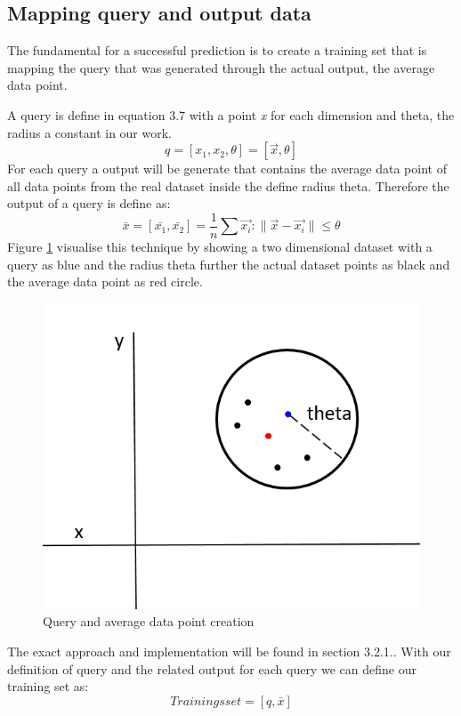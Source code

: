 \documentclass{lmproj}
\begin{document}
\subsection{Mapping query and output data}

The fundamental for a successful prediction is to create a training set that is mapping the query that was generated through the actual output, the average data point.

A query is define in equation 3.7 with a point \textit{x} for each dimension and theta, the radius a constant in our work.  
\begin{equation}
q=[x_1,x_2,\theta] =[\vec{x},\theta]
\end{equation}
For each query a output will be generate that contains the average data point of all data points from the real dataset inside the define radius theta. Therefore the output of a query is define as:
\begin{equation}
\bar{x}=[\bar{x_1},\bar{x_2}]=\frac{1}{n}\sum \vec{x_i}:\parallel \vec{x}-\vec{x_i}\parallel \leq \theta
\end{equation}
Figure \ref{fig:Query} visualise this technique by showing a two dimensional dataset with a query as blue and the radius theta further the actual dataset points as black and the average data point as red circle.
 \begin{figure}[ht]
	\centering
	\includegraphics[width=0.6\linewidth]{Query.PNG}
	\caption[Query]{Query and average data point creation}
	\label{fig:Query}
\end{figure}

The exact approach and implementation will be found in section 3.2.1.. With our definition of query and the related output for each query we can define our training set as:
\begin{equation}
Trainingsset=[q,\bar{x}]
\end{equation}
\end{document}
